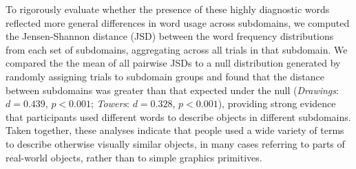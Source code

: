\documentclass[10pt,letterpaper]{article}
\begin{document}
To rigorously evaluate whether the presence of these highly diagnostic words reflected more general differences in word usage across subdomains, we computed the Jensen-Shannon distance (JSD) between the word frequency distributions from each set of subdomains, aggregating across all trials in that subdomain.
We compared the the mean of all pairwise JSDs to a null distribution generated by randomly assigning trials to subdomain groups and found that the distance between subdomains was greater than that expected under the null (\textit{Drawings}: $d = 0.439$, $p < 0.001$; \textit{Towers}: $d = 0.328$, $p < 0.001$), providing strong evidence that participants used different words to describe objects in different subdomains.
Taken together, these analyses indicate that people used a wide variety of terms to describe otherwise visually similar objects, in many cases referring to parts of real-world objects, rather than to simple graphics primitives.



\end{document}
